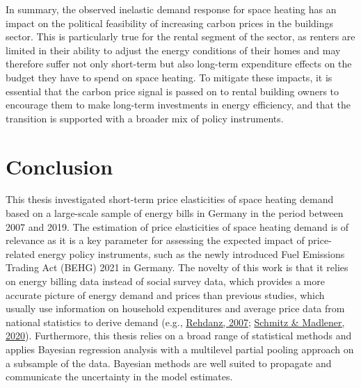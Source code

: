 \documentclass[12pt,twoside]{reedthesis}
\begin{document}
In summary, the observed inelastic demand response for space heating has an impact on the political feasibility of increasing carbon prices in the buildings sector. This is particularly true for the rental segment of the sector, as renters are limited in their ability to adjust the energy conditions of their homes and may therefore suffer not only short-term but also long-term expenditure effects on the budget they have to spend on space heating. To mitigate these impacts, it is essential that the carbon price signal is passed on to rental building owners to encourage them to make long-term investments in energy efficiency, and that the transition is supported with a broader mix of policy instruments.

\hypertarget{conclusion}{%
\chapter{Conclusion}\label{conclusion}}

This thesis investigated short-term price elasticities of space heating demand based on a large-scale sample of energy bills in Germany in the period between 2007 and 2019. The estimation of price elasticities of space heating demand is of relevance as it is a key parameter for assessing the expected impact of price-related energy policy instruments, such as the newly introduced Fuel Emissions Trading Act (BEHG) 2021 in Germany. The novelty of this work is that it relies on energy billing data instead of social survey data, which provides a more accurate picture of energy demand and prices than previous studies, which usually use information on household expenditures and average price data from national statistics to derive demand (e.g., \protect\hyperlink{ref-rehdanz07}{Rehdanz, 2007}; \protect\hyperlink{ref-schmitz_madlener20}{Schmitz \& Madlener, 2020}). Furthermore, this thesis relies on a broad range of statistical methods and applies Bayesian regression analysis with a multilevel partial pooling approach on a subsample of the data. Bayesian methods are well suited to propagate and communicate the uncertainty in the model estimates.
\end{document}
